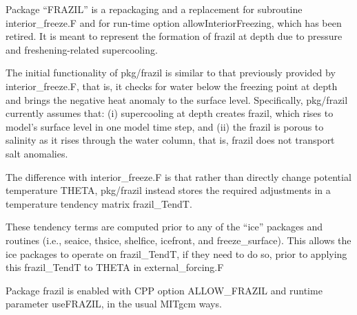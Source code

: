 
Package ``FRAZIL'' is a repackaging and a replacement for subroutine
interior_freeze.F and for run-time option allowInteriorFreezing, which has
been retired.  It is meant to represent the formation of frazil at depth due
to pressure and freshening-related supercooling.

The initial functionality of pkg/frazil is similar to that previously provided
by interior_freeze.F, that is, it checks for water below the freezing point at
depth and brings the negative heat anomaly to the surface level.
Specifically, pkg/frazil currently assumes that: (i) supercooling at depth
creates frazil, which rises to model's surface level in one model time step,
and (ii) the frazil is porous to salinity as it rises through the water
column, that is, frazil does not transport salt anomalies.

The difference with interior_freeze.F is that rather than directly change
potential temperature THETA, pkg/frazil instead stores the required
adjustments in a temperature tendency matrix frazil_TendT.

These tendency terms are computed prior to any of the ``ice'' packages and
routines (i.e., seaice, thsice, shelfice, icefront, and freeze_surface).  This
allows the ice packages to operate on frazil_TendT, if they need to do so,
prior to applying this frazil_TendT to THETA in external_forcing.F

Package frazil is enabled with CPP option ALLOW_FRAZIL and runtime parameter
useFRAZIL, in the usual MITgcm ways.
